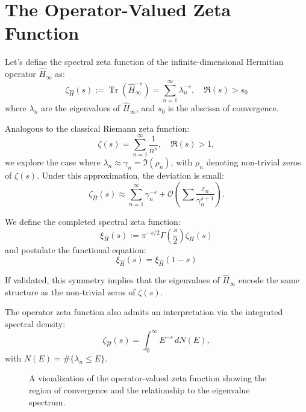 \section{The Operator-Valued Zeta Function}
\vspace{10pt}

Let's define the spectral zeta function of the infinite-dimensional Hermitian operator \( \hat{H}_\infty \) as:
\[
\boxed{
\zeta_{\hat{H}}(s) := \operatorname{Tr}(\hat{H}_\infty^{-s}) = \sum_{n=1}^\infty \lambda_n^{-s}, \quad \Re(s) > s_0
}
\]
where \( \lambda_n \) are the eigenvalues of \( \hat{H}_\infty \), and \( s_0 \) is the abscissa of convergence.

Analogous to the classical Riemann zeta function:
\[
\zeta(s) = \sum_{n=1}^\infty \frac{1}{n^s}, \quad \Re(s) > 1,
\]
we explore the case where \( \lambda_n \approx \gamma_n = \Im(\rho_n) \), with \( \rho_n \) denoting non-trivial zeros of \( \zeta(s) \). Under this approximation, the deviation is small:
\[
\zeta_{\hat{H}}(s) \approx \sum_{n=1}^\infty \gamma_n^{-s} + \mathcal{O}\left( \sum \frac{\varepsilon_n}{\gamma_n^{s+1}} \right).
\]

We define the completed spectral zeta function:
\[
\boxed{
\xi_{\hat{H}}(s) := \pi^{-s/2} \Gamma\left( \frac{s}{2} \right) \zeta_{\hat{H}}(s)
}
\]
and postulate the functional equation:
\[
\boxed{
\xi_{\hat{H}}(s) = \xi_{\hat{H}}(1 - s)
}
\]

If validated, this symmetry implies that the eigenvalues of \( \hat{H}_\infty \) encode the same structure as the non-trivial zeros of \( \zeta(s) \).

The operator zeta function also admits an interpretation via the integrated spectral density:
\[
\zeta_{\hat{H}}(s) = \int_0^\infty E^{-s} \, dN(E),
\]
with \( N(E) = \#\{ \lambda_n \leq E \} \).

\begin{figure}[h]
\centering
{}
\caption{A visualization of the operator-valued zeta function showing the region of convergence and the relationship to the eigenvalue spectrum.}
\label{fig:spectral_zeta}
\end{figure}